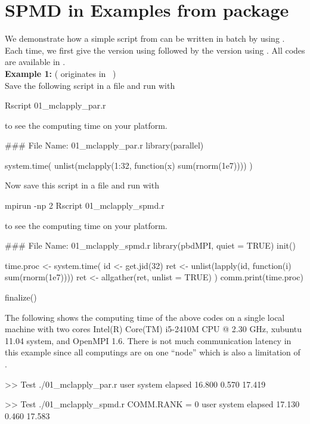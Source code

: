 
\section[SPMD in Examples from package \pkg{parallel}]{SPMD in Examples from package }
\label{sec:analog_examples}

We demonstrate how a simple script from  can be
written in batch by using .  Each time, we first give the
version using  followed by the
version using . All codes are available in
. \\

{\bf Example 1:}
( originates in ~\citep{Urbanek2011}) \\
Save the following script in a file and run with
\begin{Command}
Rscript 01_mclapply_par.r
\end{Command}
to see the computing time on your platform.
\begin{Code}[title=\pkg{multicore} R Script]
### File Name: 01_mclapply_par.r
library(parallel)

system.time(
  unlist(mclapply(1:32, function(x) sum(rnorm(1e7))))
)
\end{Code}
Now save this script in a file and run with
\begin{Command}
mpirun -np 2 Rscript 01_mclapply_spmd.r
\end{Command}
to see the computing time on your platform.
\begin{Code}[title=SPMD R Script]
### File Name: 01_mclapply_spmd.r
library(pbdMPI, quiet = TRUE)
init()

time.proc <- system.time({
  id <- get.jid(32)
  ret <- unlist(lapply(id, function(i) sum(rnorm(1e7))))
  ret <- allgather(ret, unlist = TRUE)
})
comm.print(time.proc)

finalize()
\end{Code}

The following shows the computing time of the above codes
on a single local machine with two cores
Intel(R) Core(TM) i5-2410M CPU @ 2.30 GHz, xubuntu 11.04 system,
and OpenMPI 1.6. There is not much communication latency in this example
since all computings are on one ``node'' which is also
a limitation of .
\begin{CodeOutput}
>> Test ./01_mclapply_par.r
   user  system elapsed
 16.800   0.570  17.419

>> Test ./01_mclapply_spmd.r
COMM.RANK = 0
   user  system elapsed
 17.130   0.460  17.583
\end{CodeOutput}


